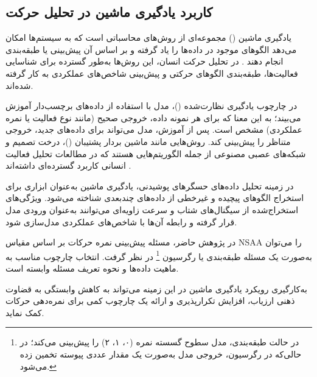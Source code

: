 \subsection{کاربرد یادگیری ماشین در تحلیل حرکت}

یادگیری ماشین () مجموعه‌ای از روش‌های محاسباتی است که به سیستم‌ها امکان می‌دهد الگوهای موجود در داده‌ها را یاد گرفته و بر اساس آن پیش‌بینی یا طبقه‌بندی انجام دهند \cite{Bishop2006PatternRecognition}. در تحلیل حرکت انسان، این روش‌ها به‌طور گسترده برای شناسایی فعالیت‌ها، طبقه‌بندی الگوهای حرکتی و پیش‌بینی شاخص‌های عملکردی به کار گرفته شده‌اند.

در چارچوب یادگیری نظارت‌شده ()، مدل با استفاده از داده‌های برچسب‌دار آموزش می‌بیند؛ به این معنا که برای هر نمونه داده، خروجی صحیح (مانند نوع فعالیت یا نمره عملکردی) مشخص است. پس از آموزش، مدل می‌تواند برای داده‌های جدید، خروجی متناظر را پیش‌بینی کند. روش‌هایی مانند ماشین بردار پشتیبان ()، درخت تصمیم و شبکه‌های عصبی مصنوعی از جمله الگوریتم‌هایی هستند که در مطالعات تحلیل فعالیت انسانی کاربرد گسترده‌ای داشته‌اند \cite{Lara2013Survey}.

در زمینه تحلیل داده‌های حسگرهای پوشیدنی، یادگیری ماشین به‌عنوان ابزاری برای استخراج الگوهای پیچیده و غیرخطی از داده‌های چندبعدی شناخته می‌شود. ویژگی‌های استخراج‌شده از سیگنال‌های شتاب و سرعت زاویه‌ای می‌توانند به‌عنوان ورودی مدل قرار گرفته و رابطه آن‌ها با شاخص‌های عملکردی مدل‌سازی شود.

در پژوهش حاضر، مسئله پیش‌بینی نمره حرکات بر اساس مقیاس NSAA را می‌توان به‌صورت یک مسئله طبقه‌بندی یا رگرسیون
\footnote{
	در حالت طبقه‌بندی، مدل سطوح گسسته نمره (۰، ۱، ۲) را پیش‌بینی می‌کند؛ در حالی‌که در رگرسیون، خروجی مدل به‌صورت یک مقدار عددی پیوسته تخمین زده می‌شود.
}
	 در نظر گرفت. انتخاب چارچوب مناسب به ماهیت داده‌ها و نحوه تعریف مسئله وابسته است.

به‌کارگیری رویکرد یادگیری ماشین در این زمینه می‌تواند به کاهش وابستگی به قضاوت ذهنی ارزیاب، افزایش تکرارپذیری و ارائه یک چارچوب کمی برای نمره‌دهی حرکات کمک نماید.
